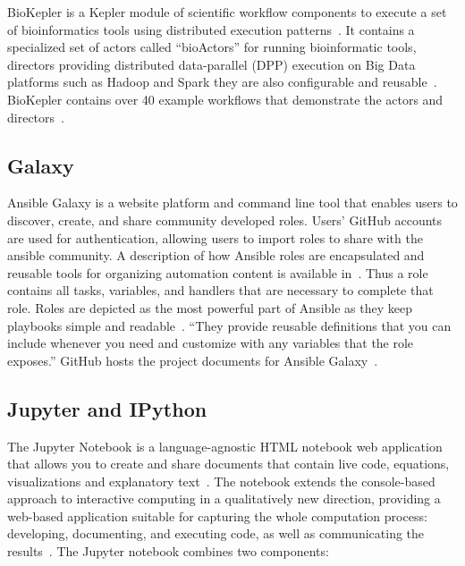 BioKepler is a Kepler module of scientific workflow components to
execute a set of bioinformatics tools using distributed execution
patterns~\cite{www-biokepler}. It contains a specialized set of actors
called ``bioActors'' for running bioinformatic tools, directors
providing distributed data-parallel (DPP) execution on Big Data
platforms such as Hadoop and Spark they are also configurable and
reusable~\cite{www-biokepler-demos}. BioKepler contains over 40
example workflows that demonstrate the actors and
directors~\cite{bioActors}.

    \pv
    
\subsection{Galaxy}

Ansible Galaxy is a website platform and command line tool that
enables users to discover, create, and share community developed
roles. Users' GitHub accounts are used for authentication, allowing
users to import roles to share with the ansible community. A
description of how Ansible roles are encapsulated and reusable tools
for organizing automation content is available
in~\cite{www-galaxy-ansible}. Thus a role contains all tasks,
variables, and handlers that are necessary to complete that
role. Roles are depicted as the most powerful part of Ansible as they
keep playbooks simple and readable~\cite{Ansible-book-2016}. ``They
provide reusable definitions that you can include whenever you need
and customize with any variables that the role exposes.'' GitHub hosts
the project documents for Ansible Galaxy~\cite{www-github-galaxy}.


    \pv

\subsection{Jupyter and IPython}

The Jupyter Notebook is a language-agnostic HTML notebook web
application that allows you to create and share documents that contain
live code, equations, visualizations and explanatory
text~\cite{www-jupyter-1}. The notebook extends the console-based
approach to interactive computing in a qualitatively new direction,
providing a web-based application suitable for capturing the whole
computation process: developing, documenting, and executing code, as
well as communicating the results~\cite{www-jupyter-2}. The Jupyter
notebook combines two components:
    
